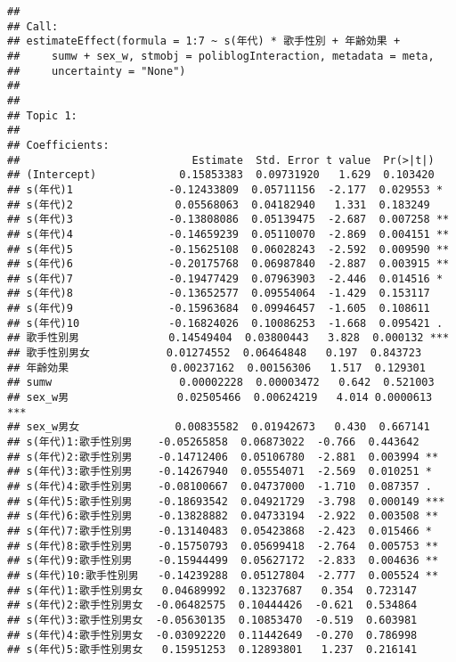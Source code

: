 \documentclass[
]{article}
\begin{document}
\begin{verbatim}
## 
## Call:
## estimateEffect(formula = 1:7 ~ s(年代) * 歌手性別 + 年齢効果 + 
##     sumw + sex_w, stmobj = poliblogInteraction, metadata = meta, 
##     uncertainty = "None")
## 
## 
## Topic 1:
## 
## Coefficients:
##                           Estimate  Std. Error t value  Pr(>|t|)    
## (Intercept)             0.15853383  0.09731920   1.629  0.103420    
## s(年代)1               -0.12433809  0.05711156  -2.177  0.029553 *  
## s(年代)2                0.05568063  0.04182940   1.331  0.183249    
## s(年代)3               -0.13808086  0.05139475  -2.687  0.007258 ** 
## s(年代)4               -0.14659239  0.05110070  -2.869  0.004151 ** 
## s(年代)5               -0.15625108  0.06028243  -2.592  0.009590 ** 
## s(年代)6               -0.20175768  0.06987840  -2.887  0.003915 ** 
## s(年代)7               -0.19477429  0.07963903  -2.446  0.014516 *  
## s(年代)8               -0.13652577  0.09554064  -1.429  0.153117    
## s(年代)9               -0.15963684  0.09946457  -1.605  0.108611    
## s(年代)10              -0.16824026  0.10086253  -1.668  0.095421 .  
## 歌手性別男              0.14549404  0.03800443   3.828  0.000132 ***
## 歌手性別男女            0.01274552  0.06464848   0.197  0.843723    
## 年齢効果                0.00237162  0.00156306   1.517  0.129301    
## sumw                    0.00002228  0.00003472   0.642  0.521003    
## sex_w男                 0.02505466  0.00624219   4.014 0.0000613 ***
## sex_w男女               0.00835582  0.01942673   0.430  0.667141    
## s(年代)1:歌手性別男    -0.05265858  0.06873022  -0.766  0.443642    
## s(年代)2:歌手性別男    -0.14712406  0.05106780  -2.881  0.003994 ** 
## s(年代)3:歌手性別男    -0.14267940  0.05554071  -2.569  0.010251 *  
## s(年代)4:歌手性別男    -0.08100667  0.04737000  -1.710  0.087357 .  
## s(年代)5:歌手性別男    -0.18693542  0.04921729  -3.798  0.000149 ***
## s(年代)6:歌手性別男    -0.13828882  0.04733194  -2.922  0.003508 ** 
## s(年代)7:歌手性別男    -0.13140483  0.05423868  -2.423  0.015466 *  
## s(年代)8:歌手性別男    -0.15750793  0.05699418  -2.764  0.005753 ** 
## s(年代)9:歌手性別男    -0.15944499  0.05627172  -2.833  0.004636 ** 
## s(年代)10:歌手性別男   -0.14239288  0.05127804  -2.777  0.005524 ** 
## s(年代)1:歌手性別男女   0.04689992  0.13237687   0.354  0.723147    
## s(年代)2:歌手性別男女  -0.06482575  0.10444426  -0.621  0.534864    
## s(年代)3:歌手性別男女  -0.05630135  0.10853470  -0.519  0.603981    
## s(年代)4:歌手性別男女  -0.03092220  0.11442649  -0.270  0.786998    
## s(年代)5:歌手性別男女   0.15951253  0.12893801   1.237  0.216141    

\end{verbatim}
\end{document}
